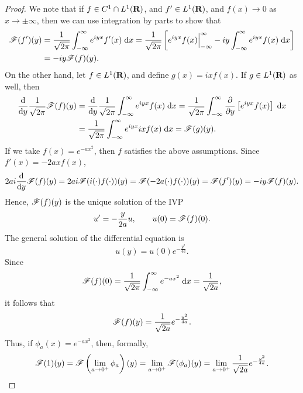 \documentclass{homework}
\begin{document}
\begin{arabicparts}
		\begin{proof}
			We note that if $f \in C^1\cap L^1(\textnormal{\bf R})$, and $f' \in L^1(\textnormal{\bf R})$, and $f(x)\to 0$ as $x\to\pm\infty$, then we can use integration by parts to show that
			\begin{align}
				\mathscr{F}(f')(y) &= \frac{1}{\sqrt{2\pi}}\int_{-\infty}^\infty e^{iyx}f'(x)\;\text{d} x = \frac{1}{\sqrt{2\pi}}\left[e^{iyx}f(x)\Big\vert_{-\infty}^\infty - iy\int_{-\infty}^\infty e^{iyx}f(x)\;\text{d} x\right] \\
				&= -iy\mathscr{F}(f)(y).
			\end{align}
			On the other hand, let $f\in L^1(\textnormal{\bf R})$, and define $g(x) = ixf(x)$. If $g \in L^1(\textnormal{\bf R})$ as well, then
			\begin{align}
				\frac{\text{d} {}}{\text{d} {y}} \frac{1}{\sqrt{2\pi}}\mathscr{F}(f)(y) &= \frac{\text{d} {}}{\text{d} {y}} \frac{1}{\sqrt{2\pi}}\int_{-\infty}^\infty e^{iyx}f(x)\;\text{d} x =\frac{1}{\sqrt{2\pi}}\int_{-\infty}^\infty \frac{\partial }{\partial y}\left[e^{iyx}f(x)\right]\;\text{d} x \\
				&= \frac{1}{\sqrt{2\pi}}\int_{-\infty}^\infty e^{iyx}ixf(x)\;\text{d} x = \mathscr{F}(g)(y).
			\end{align}
			If we take $f(x) = e^{-ax^2}$, then $f$ satisfies the above assumptions. Since $f'(x) = -2axf(x)$,
			\begin{equation}
				2ai \frac{\text{d} {}}{\text{d} {y}}\mathscr{F}(f)(y) = 2ai\mathscr{F}(i(\cdot)f(\cdot))(y) = \mathscr{F}(-2a(\cdot)f(\cdot))(y) = \mathscr{F}(f')(y) =-iy\mathscr{F}(f)(y).
			\end{equation}
			Hence, $\mathscr{F}(f)(y)$ is the unique solution of the IVP
			\begin{equation}
				u' = -\frac{y}{2a}u,\qquad u(0) = \mathscr{F}(f)(0).
			\end{equation}
			The general solution of the differential equation is
			\begin{equation}
				u(y) = u(0)e^{-\frac{y^2}{4a}}.
			\end{equation}
			Since
			\begin{equation}
				\mathscr{F}(f)(0) = \frac{1}{\sqrt{2\pi}}\int_{-\infty}^\infty e^{-ax^2}\;\text{d} x = \frac{1}{\sqrt{2a}},
			\end{equation}
			it follows that
			\begin{equation}
				\label{eq:gaussian_fourier_transform}
				\mathscr{F}(f)(y) = \frac{1}{\sqrt{2a}} e^{-\frac{y^2}{4a}}.
			\end{equation}
			Thus, if $\phi_a(x) = e^{-ax^2}$, then, formally,
			\begin{equation}
				\fourier(1)(y) = \fourier\left(\lim_{a\to 0^+}\phi_a\right)(y) = \lim_{a\to 0^+}\fourier(\phi_a)(y)= \lim_{a\to 0^+}\frac{1}{\sqrt{2a}}e^{-\frac{y^2}{4a}}.

\end{equation}
\end{proof}
\end{arabicparts}
\end{document}
